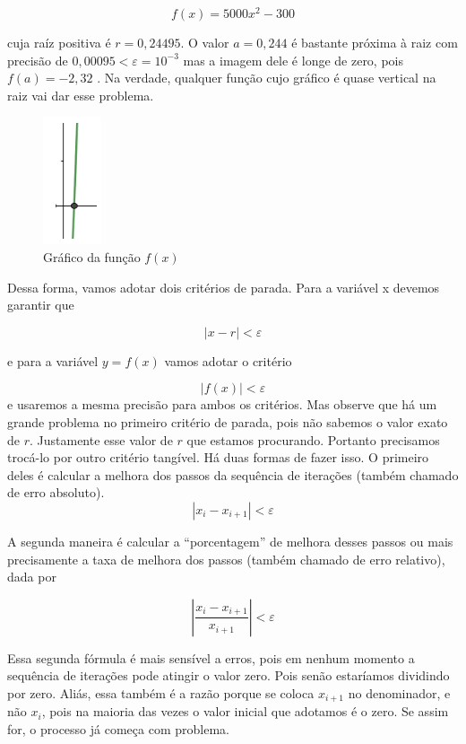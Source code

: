 \documentclass[
  letterpaper,
  DIV=11,
  numbers=noendperiod]{scrreprt}
\begin{document}
\[f(x)=5000x^2-300\]

cuja raíz positiva é \(r=0,24495\). O valor \(a=0,244\) é bastante
próxima à raiz com precisão de \(0,00095<\varepsilon=10^{-3}\) mas a
imagem dele é longe de zero, pois \(f(a)=-2,32\) . Na verdade, qualquer
função cujo gráfico é quase vertical na raiz vai dar esse problema.

\begin{figure}[H]

{\centering \includegraphics{Casivertical.png}

}

\caption{Gráfico da função \(f(x)\)}

\end{figure}%

Dessa forma, vamos adotar dois critérios de parada. Para a variável x
devemos garantir que

\[|x-r|<\varepsilon\]

e para a variável \(y=f(x)\) vamos adotar o critério

\[|f(x)|<\varepsilon\] e usaremos a mesma precisão para ambos os
critérios. Mas observe que há um grande problema no primeiro critério de
parada, pois não sabemos o valor exato de \(r\). Justamente esse valor
de \(r\) que estamos procurando. Portanto precisamos trocá-lo por outro
critério tangível. Há duas formas de fazer isso. O primeiro deles é
calcular a melhora dos passos da sequência de iterações (também chamado
de erro absoluto). \[|x_{i}-x_{i+1}|<\varepsilon\]

A segunda maneira é calcular a ``porcentagem'' de melhora desses passos
ou mais precisamente a taxa de melhora dos passos (também chamado de
erro relativo), dada por

\[\left|\frac{x_{i}-x_{i+1}}{x_{i+1}}\right|<\varepsilon\]

Essa segunda fórmula é mais sensível a erros, pois em nenhum momento a
sequência de iterações pode atingir o valor zero. Pois senão estaríamos
dividindo por zero. Aliás, essa também é a razão porque se coloca
\(x_{i+1}\) no denominador, e não \(x_{i}\), pois na maioria das vezes o
valor inicial que adotamos é o zero. Se assim for, o processo já começa
com problema.
\end{document}
